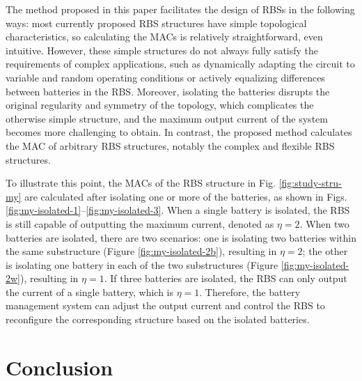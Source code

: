 \documentclass{article}
\begin{document}
The method proposed in this paper facilitates the design of RBSs in the following ways:
most currently proposed RBS structures \cite{ciNovelDesignAdaptive2007,alahmadBatterySwitchArray2008,kimDependableEfficientScalable2010b,kimBalancedReconfigurationStorage2011a,taesickimSeriesconnectedSelfreconfigurableMulticell2012a,6843711} have simple topological characteristics, so calculating the MACs is relatively straightforward, even intuitive.
However, these simple structures do not always fully satisfy the requirements of complex applications, such as dynamically adapting the circuit to variable and random operating conditions or actively equalizing differences between batteries in the RBS.
Moreover, isolating the batteries disrupts the original regularity and symmetry of the topology, which complicates the otherwise simple structure, and the maximum output current of the system becomes more challenging to obtain.
In contrast, the proposed method calculates the MAC of arbitrary RBS structures, notably the complex and flexible RBS structures.


To illustrate this point, the MACs of the RBS structure in Fig. \ref{fig:study-stru-my} are calculated after isolating one or more of the batteries, as shown in Figs. \ref{fig:my-isolated-1}--\ref{fig:my-isolated-3}. 
When a single battery is isolated, the RBS is still capable of outputting the maximum current, denoted as $\eta=2$.
When two batteries are isolated, there are two scenarios: 
one is isolating two batteries within the same substructure (Figure \ref{fig:my-isolated-2b}), resulting in $\eta=2$; the other is isolating one battery in each of the two substructures (Figure \ref{fig:my-isolated-2w}), resulting in $\eta=1$. 
If three batteries are isolated, the RBS can only output the current of a single battery, which is $\eta=1$.
Therefore, the battery management system can adjust the output current and control the RBS to reconfigure the corresponding structure based on the isolated batteries.


\section{Conclusion}
\end{document}
